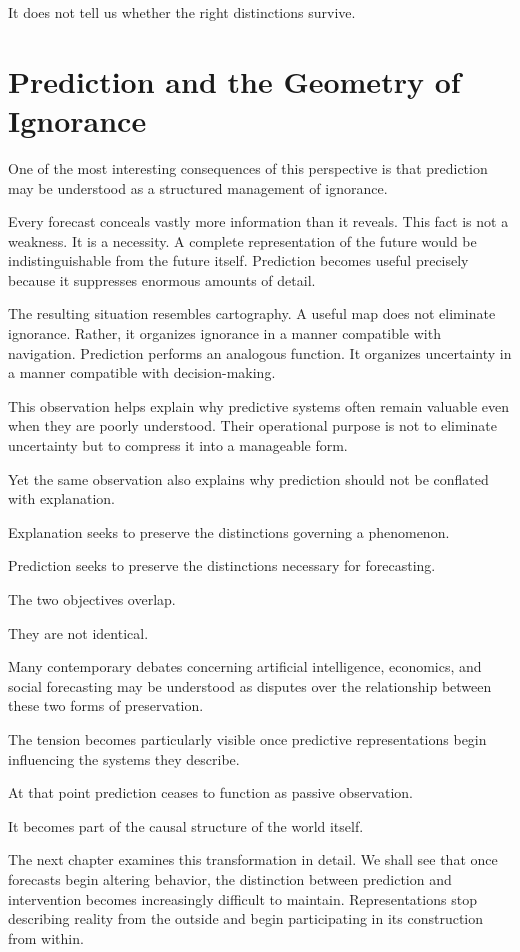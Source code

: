 \documentclass[11pt,oneside,openany]{book}
\begin{document}
It does not tell us whether the right distinctions survive.

\section{Prediction and the Geometry of Ignorance}

One of the most interesting consequences of this perspective is that prediction may be understood as a structured management of ignorance.

Every forecast conceals vastly more information than it reveals. This fact is not a weakness. It is a necessity. A complete representation of the future would be indistinguishable from the future itself. Prediction becomes useful precisely because it suppresses enormous amounts of detail.

The resulting situation resembles cartography. A useful map does not eliminate ignorance. Rather, it organizes ignorance in a manner compatible with navigation. Prediction performs an analogous function. It organizes uncertainty in a manner compatible with decision-making.

This observation helps explain why predictive systems often remain valuable even when they are poorly understood. Their operational purpose is not to eliminate uncertainty but to compress it into a manageable form.

Yet the same observation also explains why prediction should not be conflated with explanation.

Explanation seeks to preserve the distinctions governing a phenomenon.

Prediction seeks to preserve the distinctions necessary for forecasting.

The two objectives overlap.

They are not identical.

Many contemporary debates concerning artificial intelligence, economics, and social forecasting may be understood as disputes over the relationship between these two forms of preservation.

The tension becomes particularly visible once predictive representations begin influencing the systems they describe.

At that point prediction ceases to function as passive observation.

It becomes part of the causal structure of the world itself.

The next chapter examines this transformation in detail. We shall see that once forecasts begin altering behavior, the distinction between prediction and intervention becomes increasingly difficult to maintain. Representations stop describing reality from the outside and begin participating in its construction from within.
\end{document}
